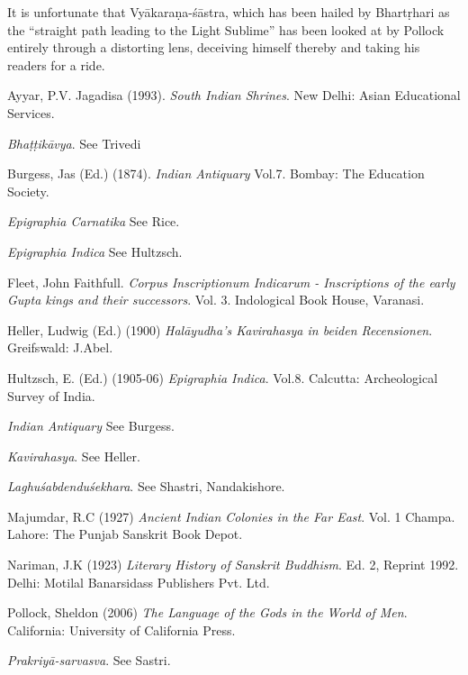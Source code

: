 It is unfortunate that Vyākaraṇa-śāstra, which has been hailed by Bhartṛhari as the ``straight path leading to the Light Sublime'' has been looked at by Pollock entirely through a distorting lens, deceiving himself thereby and taking his readers for a ride. 

\newpage

\begin{thebibliography}{99}
\itemsep=2pt
Ayyar, P.V. Jagadisa (1993). {\sl South Indian Shrines}. New Delhi: Asian Educational Services. 

{\sl Bhaṭṭikāvya}. See Trivedi

Burgess, Jas (Ed.) (1874). {\sl Indian Antiquary} Vol.7. Bombay: The Education Society.

{\sl Epigraphia Carnatika} See Rice. 

{\sl Epigraphia Indica} See Hultzsch. 

Fleet, John Faithfull. {\sl Corpus Inscriptionum Indicarum - Inscriptions of the early Gupta kings and their successors}. Vol. 3. Indological Book House, Varanasi.

Heller, Ludwig (Ed.) (1900) {\sl Halāyudha's Kavirahasya in beiden Recensionen}. Greifswald: J.Abel.

Hultzsch, E. (Ed.) (1905-06) {\sl Epigraphia Indica}. Vol.8. Calcutta: Archeological Survey of India.

{\sl Indian Antiquary} See Burgess.

{\sl Kavirahasya}. See Heller. 

{\sl Laghuśabdenduśekhara}. See Shastri, Nandakishore.

Majumdar, R.C (1927) {\sl Ancient Indian Colonies in the Far East}. Vol. 1 Champa. Lahore: The Punjab Sanskrit Book Depot. 

Nariman, J.K (1923) {\sl Literary History of Sanskrit Buddhism}. Ed. 2, Reprint 1992. Delhi: Motilal Banarsidass Publishers Pvt. Ltd. 

Pollock, Sheldon (2006) {\sl The Language of the Gods in the World of Men}. California: University of California Press. 

{\sl Prakriyā-sarvasva}. See Sastri.


\end{thebibliography}
